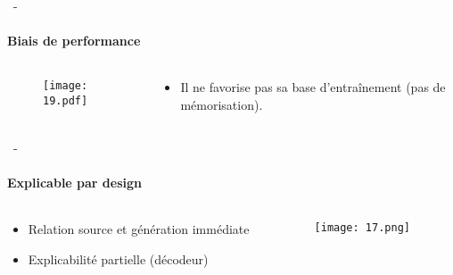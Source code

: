 \documentclass[aspectratio=169, 22pt]{beamer}
\begin{document}
\begin{frame}{\secname~- \subsecname}
  \framesubtitle{Biais de performance}
  \begin{columns}
    \begin{column}{0.7\linewidth}
      \begin{figure}
        \texttt{[image: 19.pdf]}
      \end{figure}
    \end{column}
    \begin{column}{0.3\linewidth}
      \begin{itemize}
      \item Il ne favorise pas sa base d'entraînement (pas de mémorisation).
      \end{itemize}
    \end{column}
  \end{columns}
\end{frame}

\begin{frame}{\secname~- \subsecname}
  \framesubtitle{Explicable par design}
  \begin{columns}
    \begin{column}{0.4\linewidth}
      \begin{itemize}
      \item Relation \alert{source} et \alert{génération} immédiate
      \item Explicabilité partielle (décodeur)
      \end{itemize}
    \end{column}
    \begin{column}{0.6\linewidth}
      \begin{figure}
        \texttt{[image: 17.png]}
      \end{figure}  
    \end{column}
  \end{columns}  
\end{frame}
\end{document}
